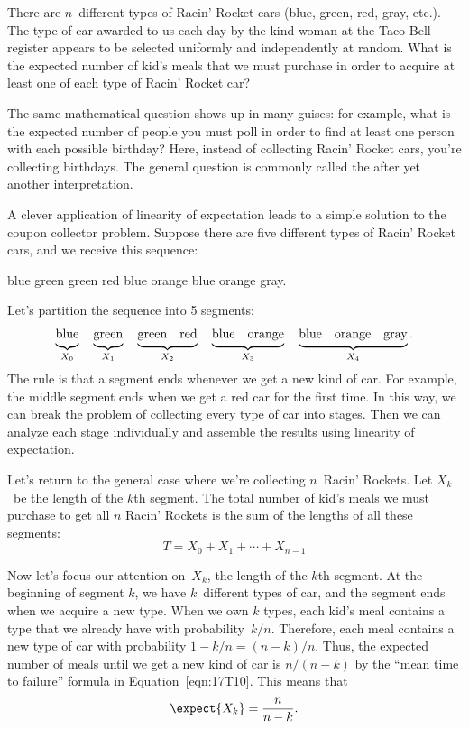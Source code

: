 There are $n$~different types of Racin' Rocket cars (blue, green, red,
gray, etc.).  The type of car awarded to us each day by the kind woman
at the Taco Bell register appears to be selected uniformly and
independently at random.  What is the expected number of kid's meals
that we must purchase in order to acquire at least one of each type of
Racin' Rocket car?

The same mathematical question shows up in many guises: for example,
what is the expected number of people you must poll in order to find
at least one person with each possible birthday?  Here, instead of
collecting Racin' Rocket cars, you're collecting birthdays.  The
general question is commonly called the  after yet another interpretation.

A clever application of linearity of expectation leads to a simple
solution to the coupon collector problem.  Suppose there are five
different types of Racin' Rocket cars, and we receive this sequence:
%
\begin{center}
blue \quad green \quad green \quad red \quad blue \quad orange \quad
blue \quad orange \quad gray.
\end{center}
%
Let's partition the sequence into 5 segments:
%
\[
\underbrace{\strut\text{blue}}_{X_0} \quad
\underbrace{\strut\text{green}}_{X_1} \quad
\underbrace{\strut\text{green} \quad \text{red}}_{X_2} \quad
\underbrace{\strut\text{blue} \quad \text{orange}}_{X_3} \quad
\underbrace{\strut\text{blue} \quad \text{orange} \quad \text{gray}}_{X_4}.
\]
%
The rule is that a segment ends whenever we get a new kind of car.
For example, the middle segment ends when we get a red car for the
first time.  In this way, we can break the problem of collecting every
type of car into stages.  Then we can analyze each stage individually
and assemble the results using linearity of expectation.

Let's return to the general case where we're collecting $n$~Racin'
Rockets.  Let $X_k$~be the length of the $k$th segment.  The total
number of kid's meals we must purchase to get all $n$ Racin' Rockets is
the sum of the lengths of all these segments:
%
\[
T = X_0 + X_1 + \cdots + X_{n-1}
\]

Now let's focus our attention on~$X_k$, the length of the $k$th
segment.  At the beginning of segment $k$, we have $k$~different types
of car, and the segment ends when we acquire a new type.  When we own
$k$ types, each kid's meal contains a type that we already have with
probability~$k / n$.  Therefore, each meal contains a new type of car
with probability $1 - k / n = (n - k) / n$.  Thus, the expected number
of meals until we get a new kind of car is $n / (n - k)$ by the ``mean
time to failure'' formula in Equation~\ref{eqn:17T10}.  This means
that
%
\[
    \expect{X_k} = \frac{n}{n - k}.
\]

